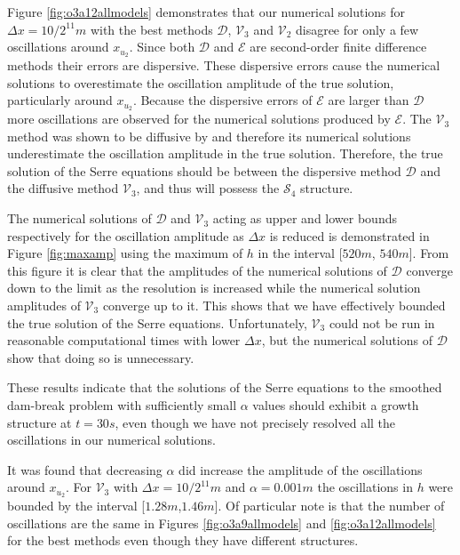 \documentclass[times]{elsarticle}
\begin{document}
Figure \ref{fig:o3a12allmodels} demonstrates that our numerical solutions for $\Delta x = 10 /2^{11}m$ with the best methods $\mathcal{D}$, $\mathcal{V}_3$ and $\mathcal{V}_2$ disagree for only a few oscillations around $x_{u_2}$. Since both $\mathcal{D}$ and $\mathcal{E}$ are second-order finite difference methods their errors are dispersive. These dispersive errors cause the numerical solutions to overestimate the oscillation amplitude of the true solution, particularly around $x_{u_2}$. Because the dispersive errors of $\mathcal{E}$ are larger than $\mathcal{D}$ more oscillations are observed for the numerical solutions produced by $\mathcal{E}$. The $\mathcal{V}_3$ method was shown to be diffusive by \citet{Zoppou-etal-2017} and therefore its numerical solutions underestimate the oscillation amplitude in the true solution. Therefore, the true solution of the Serre equations should be between the dispersive method $\mathcal{D}$ and the diffusive method $\mathcal{V}_3$, and thus will possess the $\mathcal{S}_4$ structure.

The numerical solutions of $\mathcal{D}$ and $\mathcal{V}_3$ acting as upper and lower bounds respectively for the oscillation amplitude as $\Delta x$ is reduced is demonstrated in Figure \ref{fig:maxamp} using the maximum of $h$ in the interval [$520m$, $540m$]. From this figure it is clear that the amplitudes of the numerical solutions of $\mathcal{D}$ converge down  to the limit as the resolution is increased while the numerical solution amplitudes of $\mathcal{V}_3$ converge up to it. This shows that we have effectively bounded the true solution of the Serre equations. Unfortunately, $\mathcal{V}_3$ could not be run in reasonable computational times with lower $\Delta x$, but the numerical solutions of $\mathcal{D}$ show that doing so is unnecessary.

These results indicate that the solutions of the Serre equations to the smoothed dam-break problem with sufficiently small $\alpha$ values should exhibit a growth structure at $t=30s$, even though we have not precisely resolved all the oscillations in our numerical solutions. 

It was found that decreasing $\alpha$ did increase the amplitude of the oscillations around $x_{u_2}$. For $\mathcal{V}_3$ with $\Delta x= 10/2^{11}m$ and $\alpha = 0.001m$ the oscillations in $h$ were bounded by the interval [$1.28m$,$1.46m$]. Of particular note is that the number of oscillations are the same in Figures \ref{fig:o3a9allmodels} and \ref{fig:o3a12allmodels} for the best methods even though they have different structures.
\end{document}
